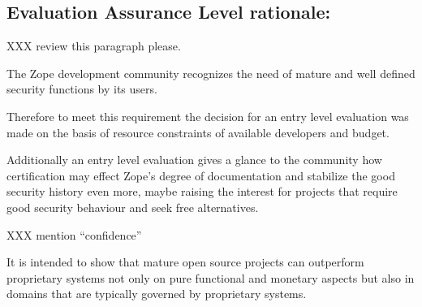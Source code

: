 \documentclass[10pt,a4paper,english]{article}
\begin{document}
\hypertarget{evaluation-assurance-level-rationale}{}
\subsection*{Evaluation Assurance Level rationale:}

XXX review this paragraph please.

The Zope development community recognizes the need of mature and well defined
security functions by its users.

Therefore to meet this requirement the decision for an entry level evaluation
was made on the basis of resource constraints of available developers and
budget.

Additionally an entry level evaluation gives a glance to the community how
certification may effect Zope's degree of documentation and stabilize the good
security history even more, maybe raising the interest for projects that
require good security behaviour and seek free alternatives.

XXX mention ``confidence''

It is intended to show that mature open source projects can outperform
proprietary systems not only on pure functional and monetary aspects but also
in domains that are typically governed by proprietary systems.



\hypertarget{glossary}{}
\end{document}
